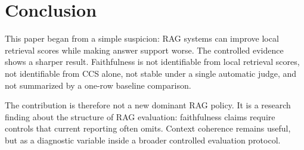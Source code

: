 \section{Conclusion}

This paper began from a simple suspicion: RAG systems can improve local
retrieval scores while making answer support worse. The controlled evidence
shows a sharper result. Faithfulness is not identifiable from local retrieval
scores, not identifiable from CCS alone, not stable under a single automatic
judge, and not summarized by a one-row baseline comparison.

The contribution is therefore not a new dominant RAG policy. It is a research
finding about the structure of RAG evaluation: faithfulness claims require
controls that current reporting often omits. Context coherence remains useful,
but as a diagnostic variable inside a broader controlled evaluation protocol.
